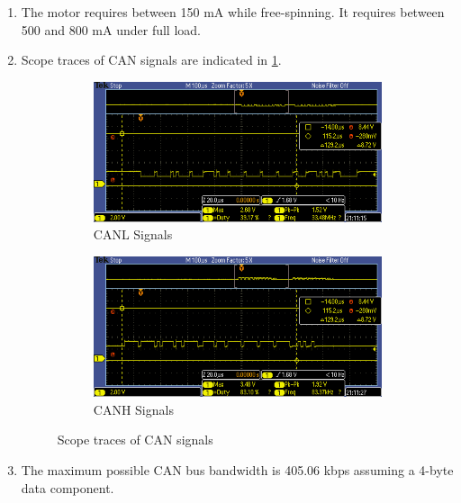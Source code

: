 \documentclass[12pt]{article}
\begin{document}
\begin{enumerate}
\item The motor requires between 150 mA while free-spinning. It
  requires between 500 and 800 mA under full load.
\item Scope traces of CAN signals are indicated in
  \cref{fig:can-frames}.
\begin{figure}[H]
  \centering
  \begin{subfigure}[b]{0.45\textwidth}
    \includegraphics[width=\textwidth]{./img/TEK00008}
    \caption{CANL Signals}
  \end{subfigure}
  \begin{subfigure}[b]{0.45\textwidth}
    \includegraphics[width=\textwidth]{./img/TEK00009}
    \caption{CANH Signals}
  \end{subfigure}
  \caption{Scope traces of CAN signals}
  \label{fig:can-frames}
\end{figure}

\item The maximum possible CAN bus bandwidth is 405.06 kbps assuming a
  4-byte data component.
\end{enumerate}

\end{document}
